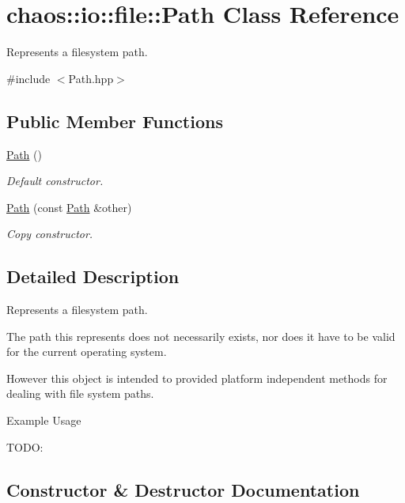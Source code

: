 \hypertarget{classchaos_1_1io_1_1file_1_1_path}{}\section{chaos\+:\+:io\+:\+:file\+:\+:Path Class Reference}
\label{classchaos_1_1io_1_1file_1_1_path}


Represents a filesystem path.  




{\ttfamily \#include $<$Path.\+hpp$>$}

\subsection*{Public Member Functions}
\begin{DoxyCompactItemize}
\item 
\hyperlink{classchaos_1_1io_1_1file_1_1_path_ae221e8dceeedda7ef0376e408a33b388}{Path} ()
\begin{DoxyCompactList}\small\item\em Default constructor. \end{DoxyCompactList}\item 
\hyperlink{classchaos_1_1io_1_1file_1_1_path_a888031f678ac29c3c068c7c710057809}{Path} (const \hyperlink{classchaos_1_1io_1_1file_1_1_path}{Path} \&other)
\begin{DoxyCompactList}\small\item\em Copy constructor. \end{DoxyCompactList}\end{DoxyCompactItemize}


\subsection{Detailed Description}
Represents a filesystem path. 

The path this represents does not necessarily exists, nor does it have to be valid for the current operating system.

However this object is intended to provided platform independent methods for dealing with file system paths.

\begin{DoxyParagraph}{Example Usage}

\end{DoxyParagraph}
T\+O\+D\+O\+: 

\subsection{Constructor \& Destructor Documentation}
\hypertarget{classchaos_1_1io_1_1file_1_1_path_ae221e8dceeedda7ef0376e408a33b388}{}
